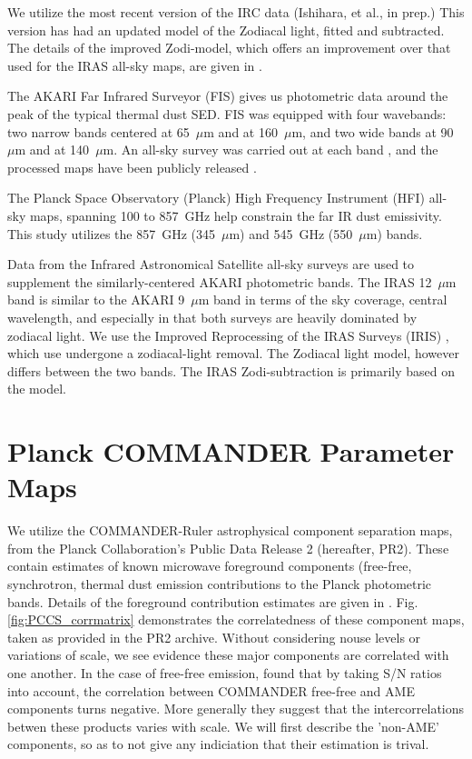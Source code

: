         We utilize the most recent version of the IRC data (Ishihara, et al., in prep.) This version has had an updated model of the Zodiacal light, fitted and subtracted. The details of the improved Zodi-model, which offers an improvement over that used for the IRAS all-sky maps, are given in \cite{kondo16}.

      The AKARI Far Infrared Surveyor (FIS) gives us photometric data around the peak of the typical thermal dust SED. FIS was equipped with four wavebands: two narrow bands centered at 65~$\mu$m and at 160~$\mu$m, and two wide bands at 90~$\mu$m and at 140~$\mu$m. An all-sky survey was carried out at each band \citep{kawada07}, and the processed maps have been publicly released \citep{doi15}.

       The Planck Space Observatory (Planck) High Frequency Instrument (HFI) all-sky maps, spanning 100 to 857~GHz \citep{hfi14viii} help constrain the far IR dust emissivity. This study utilizes the 857~GHz (345~$\mu$m) and 545~GHz (550~$\mu$m) bands.

       Data from the Infrared Astronomical Satellite \citep{iras84} all-sky surveys are used to supplement the similarly-centered AKARI photometric bands. The IRAS 12~$\mu$m band is similar to the AKARI 9~$\mu$m band in terms of the sky coverage, central wavelength, and especially in that both surveys are heavily dominated by zodiacal light. We use the Improved Reprocessing of the IRAS Surveys (IRIS) \citep{iris05}, which use undergone a zodiacal-light removal. The Zodiacal light model, however differs between the two bands. The IRAS Zodi-subtraction is primarily based on the \cite{kelsall98} model.

  \section{Planck COMMANDER Parameter Maps}

       We utilize the COMMANDER-Ruler astrophysical component separation maps, from the Planck Collaboration's Public Data Release 2 (hereafter, PR2). These contain estimates of known microwave foreground components (free-free, synchrotron, thermal dust emission contributions to the Planck photometric bands. Details of the foreground contribution estimates are given in \cite{planckXII}. Fig. \ref{fig:PCCS_corrmatrix} demonstrates the correlatedness of these component maps, taken as provided in the PR2 archive. Without considering nouse levels or variations of scale, we see evidence these major components are correlated with one another. In the case of free-free emission,  \cite{vonHausegger15} found that by taking S/N ratios into account, the correlation between COMMANDER free-free and AME components turns negative. More generally they suggest that the intercorrelations betwen these products varies with scale. We will first describe the 'non-AME' components, so as to not give any indiciation that their estimation is trival.

